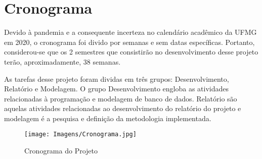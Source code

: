 \section{Cronograma}
\justifying
Devido à pandemia e a consequente incerteza no calendário acadêmico da UFMG em 2020, o cronograma foi divido por semanas e sem datas específicas. Portanto, considerou-se que os 2 semestres que consistirão no desenvolvimento desse projeto terão, aproximadamente, 38 semanas.

As tarefas desse projeto foram dividas em três grupos: Desenvolvimento, Relatório e Modelagem. O grupo  Desenvolvimento engloba as atividades relacionadas à programação e modelagem de banco de dados. Relatório são aquelas atividades relacionadas ao desenvolvimento do relatório do projeto e modelagem é a pesquisa e definição da metodologia implementada.

    \begin{figure}[H]
    \texttt{[image: Imagens/Cronograma.jpg]}
    \centering
    \caption{Cronograma do Projeto}
    \label{Schedule}
    \end{figure}